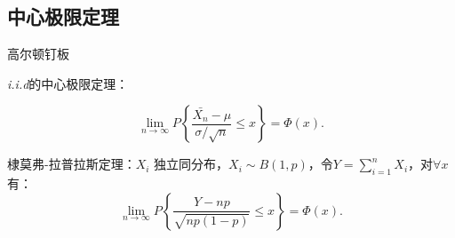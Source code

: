 \subsection{中心极限定理}%
\label{sub:中心极限定理}
\begin{eg}
    高尔顿钉板
\end{eg}
\begin{cor}
    \textit{i.i.d}的中心极限定理：

    \[
        \lim_{n \to \infty} P\left\{ \frac{\bar{X_n}-\mu}{\sigma /\sqrt{n}  }\le x  \right\} =\Phi\left( x \right) 
    .\] 
\end{cor}
\begin{cor}
    棣莫弗-拉普拉斯定理：$X_i$ 独立同分布，$X_i\sim B\left( 1,p \right) $，令$Y=\sum_{i=1}^{n} X_i$，对$\forall x$ 有：
    \[
        \lim_{n \to \infty} P\left\{ \frac{Y-np}{\sqrt{np\left( 1-p \right) } } \le x \right\} =\Phi\left( x \right) 
    .\]
\end{cor}
